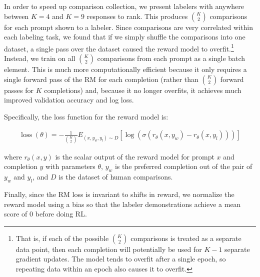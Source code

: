 \documentclass{article}
\begin{document}
In order to speed up comparison collection, we present labelers with anywhere between $K=4$ and $K=9$ responses to rank.  This produces ${K \choose 2}$ comparisons for each prompt shown to a labeler.  Since comparisons are very correlated within each labeling task, we found that if we simply shuffle the comparisons into one dataset, a single pass over the dataset caused the reward model to overfit.\footnote{That is, if each of the possible ${K \choose 2}$ comparisons is treated as a separate data point, then each completion will potentially be used for $K-1$ separate gradient updates. The model tends to overfit after a single epoch, so repeating data within an epoch also causes it to overfit.}
Instead, we train on all ${K \choose 2}$ comparisons from each prompt as a single batch element.  This is much more computationally efficient because it only requires a single forward pass of the RM for each completion (rather than ${K \choose 2}$ forward passes for $K$ completions) and, because it no longer overfits, it achieves much improved validation accuracy and log loss.

Specifically, the loss function for the reward model is:

\begin{equation} \label{eq1}
\begin{split}
\operatorname{loss}\left(\theta \right)=-\frac{1}{{K \choose 2}}E_{\left(x, y_{w}, y_{l}\right) \sim D}\left[\log \left(\sigma\left(r_{\theta}\left(x, y_{w}\right)-r_{\theta}\left(x, y_{l}\right)\right)\right)\right]
\end{split}
\end{equation}

where \( r_{\theta}(x, y) \) is the scalar output of the reward model for prompt \( x \) and completion \( y \) with parameters \( \theta \), \(y_{w}\) is the preferred completion out of the pair of \(y_{w}\) and \(y_{l}\), and $D$ is the dataset of human comparisons.

Finally, since the RM loss is invariant to shifts in reward, we normalize the reward model using a bias so that the labeler demonstrations achieve a mean score of 0 before doing RL.
\end{document}
